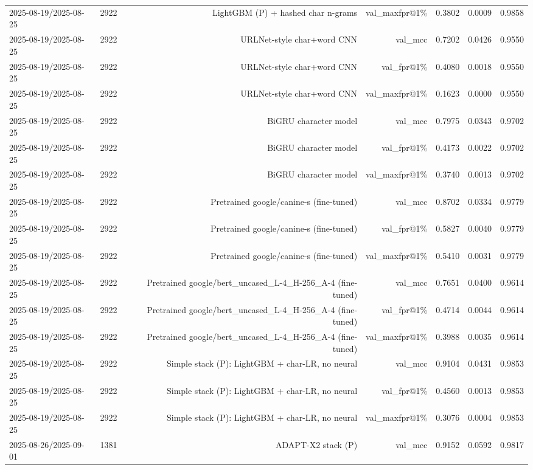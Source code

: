 \begin{table}[t]
\begin{tabular}{llrrrrr}
2025-08-19/2025-08-25 & 2922 & LightGBM (P) + hashed char n-grams & val\_maxfpr@1\% & 0.3802 & 0.0009 & 0.9858 \\
2025-08-19/2025-08-25 & 2922 & URLNet-style char+word CNN & val\_mcc & 0.7202 & 0.0426 & 0.9550 \\
2025-08-19/2025-08-25 & 2922 & URLNet-style char+word CNN & val\_fpr@1\% & 0.4080 & 0.0018 & 0.9550 \\
2025-08-19/2025-08-25 & 2922 & URLNet-style char+word CNN & val\_maxfpr@1\% & 0.1623 & 0.0000 & 0.9550 \\
2025-08-19/2025-08-25 & 2922 & BiGRU character model & val\_mcc & 0.7975 & 0.0343 & 0.9702 \\
2025-08-19/2025-08-25 & 2922 & BiGRU character model & val\_fpr@1\% & 0.4173 & 0.0022 & 0.9702 \\
2025-08-19/2025-08-25 & 2922 & BiGRU character model & val\_maxfpr@1\% & 0.3740 & 0.0013 & 0.9702 \\
2025-08-19/2025-08-25 & 2922 & Pretrained google/canine-s (fine-tuned) & val\_mcc & 0.8702 & 0.0334 & 0.9779 \\
2025-08-19/2025-08-25 & 2922 & Pretrained google/canine-s (fine-tuned) & val\_fpr@1\% & 0.5827 & 0.0040 & 0.9779 \\
2025-08-19/2025-08-25 & 2922 & Pretrained google/canine-s (fine-tuned) & val\_maxfpr@1\% & 0.5410 & 0.0031 & 0.9779 \\
2025-08-19/2025-08-25 & 2922 & Pretrained google/bert\_uncased\_L-4\_H-256\_A-4 (fine-tuned) & val\_mcc & 0.7651 & 0.0400 & 0.9614 \\
2025-08-19/2025-08-25 & 2922 & Pretrained google/bert\_uncased\_L-4\_H-256\_A-4 (fine-tuned) & val\_fpr@1\% & 0.4714 & 0.0044 & 0.9614 \\
2025-08-19/2025-08-25 & 2922 & Pretrained google/bert\_uncased\_L-4\_H-256\_A-4 (fine-tuned) & val\_maxfpr@1\% & 0.3988 & 0.0035 & 0.9614 \\
2025-08-19/2025-08-25 & 2922 & Simple stack (P): LightGBM + char-LR, no neural & val\_mcc & 0.9104 & 0.0431 & 0.9853 \\
2025-08-19/2025-08-25 & 2922 & Simple stack (P): LightGBM + char-LR, no neural & val\_fpr@1\% & 0.4560 & 0.0013 & 0.9853 \\
2025-08-19/2025-08-25 & 2922 & Simple stack (P): LightGBM + char-LR, no neural & val\_maxfpr@1\% & 0.3076 & 0.0004 & 0.9853 \\
2025-08-26/2025-09-01 & 1381 & ADAPT-X2 stack (P) & val\_mcc & 0.9152 & 0.0592 & 0.9817 \\

\end{tabular}
\end{table}
